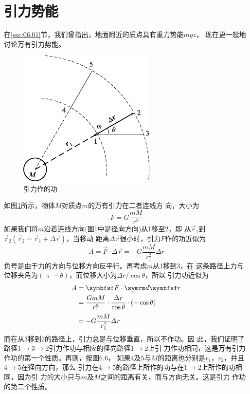 \section{引力势能}\label{sec:06.03}

在\ref{sec:06.01}节，我们曾指出，地面附近的质点具有重力势能$ mgz $，
现在更一般地讨论万有引力势能。

\begin{figure}
  \vspace{-2em}
  \centering
  \includegraphics{figure/fig06.06}
  \caption{引力作的功}
  \label{fig:06.06}
\end{figure}
如图\ref{fig:06.06}\;所示，物体$ M $对质点$ m $的万有引力在二者连线方
向，大小为%
\begin{equation*}
  F = G \frac { m M } { r ^ { 2 } }
\end{equation*}
如果我们将$ m $沿着连线方向(图\ref{fig:06.06}\;中是径向方向)从1移至2，即
从$ \vec{r} _ 1 $到$ \vec{r} _ 2 \left( \vec{r} _ 2 = \vec{r} _ 1 + \Delta \vec{r} \right) $，当移动
距离$ \Delta \vec{r} $很小时，引力$ F $作的功近似为
\begin{equation*}
  A = \vec{F} \cdot \Delta \vec{r} = - G \frac { m M } { r _ 1 ^ { 2 } } \Delta r
\end{equation*}
负号是由于力的方向与位移方向反平行。再考虑$ m $从1移到3，在
这条路径上力与位移夹角为$ \left( \uppi - \theta \right) $，而位移大小为$ \Delta r / \cos \theta $，所以
引力功近似为
\begin{equation*}
  \begin{aligned}
    A & = \vec{F} \cdot \dif \vec{r}                                                                                        \\
      & = \frac { G m M } { r _ { 1 } ^ { 2 } } \cdot \frac { \Delta r } { \cos \theta } \cdot \left( - \cos \theta \right) \\
      & = - G \frac { m M } { r _ 1 ^ { 2 } } \Delta r
  \end{aligned}
\end{equation*}
而在从3移到2的路径上，引力总是与位移垂直，所以不作功。因
此，我们证明了路径$1 \to 3 \to 2$引力作功与相应的径向路径$ 1 \to 2 $上引
力作功相同，这是万有引力作功的第一个性质。再则，按图6.6，
如果$ 4 $及$ 5 $与$ M $的距离也分别是$ r_1 $，$ r_2 $，并且$ 4 \to 5 $在径向方向，那么
引力在$ 4 \to 5 $的路径上所作的功与在$ 1 \to 2 $上所作的功相同，因为引
力的大小只与$ m $及$ M $之间的距离有关，而与方向无关。这是引力
作功的第二个性质。

